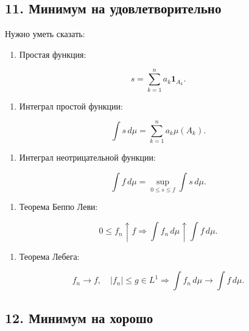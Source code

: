 \documentclass[
  11pt,
  a4paper,
]{article}
\providecommand{\tightlist}{%
  \setlength{\itemsep}{0pt}\setlength{\parskip}{0pt}}
\begin{document}
\subsection{11. Минимум на
удовлетворительно}\label{ux43cux438ux43dux438ux43cux443ux43c-ux43dux430-ux443ux434ux43eux432ux43bux435ux442ux432ux43eux440ux438ux442ux435ux43bux44cux43dux43e}

Нужно уметь сказать:

\begin{enumerate}
\def\labelenumi{\arabic{enumi}.}
\tightlist
\item
  Простая функция:
\end{enumerate}

\[
s=\sum_{k=1}^n a_k\mathbf 1_{A_k}.
\]

\begin{enumerate}
\def\labelenumi{\arabic{enumi}.}
\setcounter{enumi}{1}
\tightlist
\item
  Интеграл простой функции:
\end{enumerate}

\[
\int s\,d\mu=\sum_{k=1}^n a_k\mu(A_k).
\]

\begin{enumerate}
\def\labelenumi{\arabic{enumi}.}
\setcounter{enumi}{2}
\tightlist
\item
  Интеграл неотрицательной функции:
\end{enumerate}

\[
\int f\,d\mu=\sup_{0\le s\le f}\int s\,d\mu.
\]

\begin{enumerate}
\def\labelenumi{\arabic{enumi}.}
\setcounter{enumi}{3}
\tightlist
\item
  Теорема Беппо Леви:
\end{enumerate}

\[
0\le f_n\uparrow f
\Rightarrow
\int f_n\,d\mu\uparrow\int f\,d\mu.
\]

\begin{enumerate}
\def\labelenumi{\arabic{enumi}.}
\setcounter{enumi}{4}
\tightlist
\item
  Теорема Лебега:
\end{enumerate}

\[
f_n\to f,\quad |f_n|\le g\in L^1
\Rightarrow
\int f_n\,d\mu\to\int f\,d\mu.
\]

\subsection{12. Минимум на
хорошо}\label{ux43cux438ux43dux438ux43cux443ux43c-ux43dux430-ux445ux43eux440ux43eux448ux43e}
\end{document}
